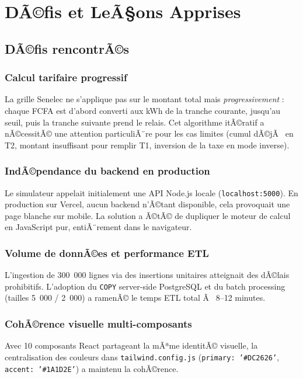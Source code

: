 \documentclass[12pt,a4paper]{report}
\begin{document}
\chapter{DÃ©fis et LeÃ§ons Apprises}

\section{DÃ©fis rencontrÃ©s}

\subsection{Calcul tarifaire progressif}
La grille Senelec ne s'applique pas sur le montant total mais \textit{progressivement} : chaque FCFA est d'abord converti aux kWh de la tranche courante, jusqu'au seuil, puis la tranche suivante prend le relais. Cet algorithme itÃ©ratif a nÃ©cessitÃ© une attention particuliÃ¨re pour les cas limites (cumul dÃ©jÃ  en T2, montant insuffisant pour remplir T1, inversion de la taxe en mode inverse).

\subsection{IndÃ©pendance du backend en production}
Le simulateur appelait initialement une API Node.js locale (\texttt{localhost:5000}). En production sur Vercel, aucun backend n'Ã©tant disponible, cela provoquait une page blanche sur mobile. La solution a Ã©tÃ© de dupliquer le moteur de calcul en JavaScript pur, entiÃ¨rement dans le navigateur.

\subsection{Volume de donnÃ©es et performance ETL}
L'ingestion de 300~000 lignes via des insertions unitaires atteignait des dÃ©lais prohibitifs. L'adoption du \texttt{COPY} server-side PostgreSQL et du batch processing (tailles 5~000 / 2~000) a ramenÃ© le temps ETL total Ã  8--12 minutes.

\subsection{CohÃ©rence visuelle multi-composants}
Avec 10 composants React partageant la mÃªme identitÃ© visuelle, la centralisation des couleurs dans \texttt{tailwind.config.js} (\texttt{primary: '\#DC2626'}, \texttt{accent: '\#1A1D2E'}) a maintenu la cohÃ©rence.
\end{document}
